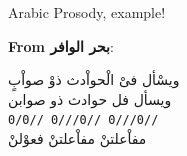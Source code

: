 \documentclass[10pt]{beamer}
\begin{document}
\begin{frame}[fragile]{Arabic Prosody, example!}

\textbf{From \textarabic{بحر الوافر}}:
\begin{center}
  \textarabic{ويسْأل فىْ الْحواْدث ذوْ صواْبٍ}\\
  \textarabic{ويسأل فل \hspace{0.4cm}
    حوادث ذو\hspace{0.4cm}
    صوابن}\\
  \texttt{0/0//     \hspace{0.3cm}
          0///0//   \hspace{0.3cm}
          0///0//}\\

  \textarabic{مفاْعلتنْ\hspace{0.7cm} 
    مفاْعلتنْ          \hspace{0.7cm}
    فعوْلنْ}
\end{center}

\end{frame}
\end{document}
